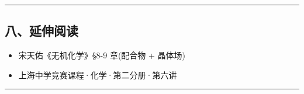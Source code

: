 \begin{center}\rule{0.5\linewidth}{0.5pt}\end{center}

\subsection{八、延伸阅读}\label{ux516bux5ef6ux4f38ux9605ux8bfb}

\begin{itemize}
\tightlist
\item
  宋天佑《无机化学》§8-9 章(配合物 + 晶体场)
\item
  上海中学竞赛课程·化学·第二分册·第六讲
\end{itemize}

\begin{center}\rule{0.5\linewidth}{0.5pt}\end{center}
